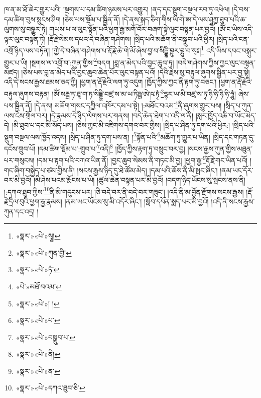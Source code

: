 ཁ་ན་མ་ཐོ་ཆེར་གྱུར་པའི། །སྔགས་པ་དམ་ཚིག་ཉམས་པར་འགྱུར། །ནད་དང་སྡུག་བསྔལ་རབ་ཏུ་འཕེལ། །དེ་བས་དམ་ཚིག་བུས་སྲུངས་ཤིག །ཅེས་པས་སྡོམ་པ་སྦྱིན་ནོ། །དེ་ནས་སྐད་ཅིག་གིས་ཡི་གེ་ཨ་དེ་ལས་ཤཱཀྱ་ཐུབ་པའི་ཆ་ལུགས་སུ་བསྒྱུར་ཏེ། གཡས་པ་ལ་ལུང་སྟོན་པའི་ཕྱག་རྒྱ་མགོ་བོར་བཞག་སྟེ་ལུང་བསྟན་པར་བྱའོ། །ཨོཾ་ང་ཡིས་འདི་ལྟར་ལུང་བསྟན་ཏེ། །རྡོ་རྗེ་སེམས་དཔའ་དེ་བཞིན་གཤེགས། །སྲིད་པའི་མཆོག་ནི་བསྒྲུབ་པའི་ཕྱིར། །སྲིད་པའི་ངན་འགྲོ་ཉིད་ལས་བཏོན། །ཀྱེ་དེ་བཞིན་གཤེགས་པ་རྡོ་རྗེ་ཆེ་གེ་མོ་ཞེས་བྱ་བ་སིདྡྷི་བྷུར་བྷུ་བ་སྭཿ།\footnote{«སྣར་»«པེ་»སྭཱ།} འདི་ཡིས་དབང་བསྐུར་གྱུར་པ་ཡི། །སྔགས་ལ་འགྲོ་བ་:ཀུན་གྱིས་\footnote{«སྣར་»«པེ་»ཀུན་གྱི་}བདག །བླ་ན་མེད་པའི་བྱང་ཆུབ་ཏུ། །བདེ་གཤེགས་ཀྱིས་ཀྱང་ལུང་བསྟན་མཛད། །ཅེས་པས་བླ་ན་མེད་པའི་བྱང་ཆུབ་ཆེན་པོར་ལུང་བསྟན་པའོ། །དེའི་རྗེས་སུ་བརྟུལ་ཞུགས་སྦྱིན་པར་བྱ་སྟེ། འདི་དེ་སངས་རྒྱས་ཐམས་ཅད་ཀྱི། །ཕྱག་ན་རྡོ་རྗེའི་ལག་ཏུ་འདུག །ཁྱོད་ཀྱིས་ཀྱང་ནི་རྟག་ཏུ་བཅང་། །ཕྱག་ན་རྡོ་རྗེའི་བརྟུལ་ཞུགས་བརྟན། །ཨོཾ་སརྦྦ་ཏ་ཐཱ་ག་ཏ་སིདྡྷི་བཛྲ་ས་མ་ཡ་ཏིཥྛ་ཨེ་ཥ་ཏྭཾ་\footnote{«སྣར་»«པེ་»ཏཾ་}དྷར་ཡ་མི་བཛྲ་ས་ཏྭ་ཧི་ཧི་ཧི་ཧི་ཧཱུཾ། ཞེས་པས་སྦྱིན་ནོ། །དེ་ནས། མཆོག་གསང་དཀྱིལ་འཁོར་དམ་པ་སྟེ། །:མཐོང་བའམ་\footnote{«པེ་»མཐོ་བའམ་}ནི་ཞུགས་གྱུར་པས། །སྲིད་པ་ཀུན་ལས་ངེས་གྲོལ་བར། །དེ་རྣམས་དེ་ཉིད་ལེགས་པར་གནས། །བདེ་ཆེན་ཐེག་པ་འདི་ལ་ནི། །སླར་ཁྱོད་འཆི་བ་ཡོང་མེད་དེ། །མི་ཐུབ་པ་དང་མི་སོད་པས། །ཅིས་ཀྱང་མི་འཇིགས་དགའ་བར་གྱིས། །སྲིད་པ་ཤིན་ཏུ་དག་པའི་ཕྱིར:། །སྲིད་པའི་སྡུག་བསྔལ་ལས་ཁྱོད་འདས། །སྲིད་པ་ཤིན་ཏུ་དག་པས་ན། །\footnote{«སྣར་»«པེ་»། །}སྟོན་པའི་\footnote{«སྣར་»«པེ་»པ་}མཆོག་ཏུ་གྱུར་པ་ཡིན། །སྲིད་དང་གཏན་དུ་དངོས་གྲུབ་པོ། །དམ་ཚིག་སྡོམ་པ་:གྲུབ་པ་\footnote{«སྣར་»«པེ་»བསྒྲུབ་པ་}འདི།\footnote{«སྣར་»«པེ་»ནི།} །ཁྱོད་ཀྱིས་རྟག་ཏུ་བསྲུང་བར་བྱ། །སངས་རྒྱས་ཀུན་གྱིས་མཐུན་པར་གསུངས། །དམ་པ་རྟག་པའི་བཀའ་ཡིན་ནོ། །བྱང་ཆུབ་སེམས་ནི་གཏང་མི་བྱ། །ཕྱག་རྒྱ་\footnote{«སྣར་»«པེ་»ན་}རྡོ་རྗེ་གང་ཡིན་པའོ། །གང་ཞིག་བསྐྱེད་པ་ཙམ་གྱིས་ནི། །སངས་རྒྱས་ཉིད་དུ་ཐེ་ཚོམ་མེད། །དམ་པའི་ཆོས་ནི་མི་སྤང་ཞིང་། །ནམ་ཡང་དོར་བར་མི་བྱའོ། །མི་ཤེས་པའམ་རྨོངས་པ་ཡི། །ཚུལ་ཆེན་བསྟན་པར་མི་བྱའོ། །བདག་ཉིད་ཡོངས་སུ་སྤངས་ནས་ནི། །:དཀའ་ཐུབ་ཀྱིས་\footnote{«སྣར་»«པེ་»དཀའ་ཐུབ་ཅི་}ནི་མི་གདུངས་པར། །ཅི་བདེ་བར་ནི་བདེ་བར་གཟུང་། །འདི་ནི་མ་བྱོན་རྫོགས་སངས་རྒྱས། །རྡོ་རྗེ་དྲིལ་བུའི་ཕྱག་རྒྱ་རྣམས། །ནམ་ཡང་ཡོངས་སུ་མི་འདོར་ཞིང་། །སློབ་དཔོན་སྨད་པར་མི་བྱའོ། །འདི་ནི་སངས་རྒྱས་ཀུན་དང་འདྲ། །
